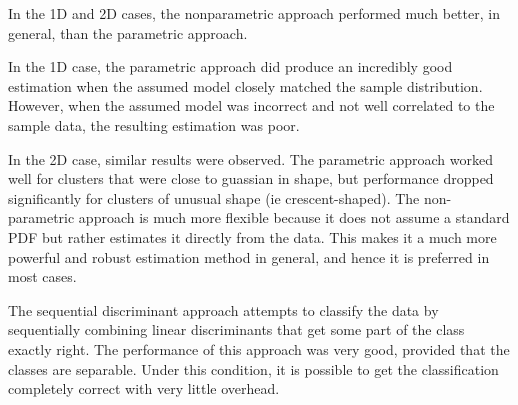 In the 1D and 2D cases, the nonparametric approach performed much better, in
general, than the parametric approach.  

In the 1D case, the parametric approach did produce an incredibly good
estimation when the assumed model closely matched the sample distribution. 
However, when the assumed model was incorrect and not well correlated to the
sample data, the resulting estimation was poor.

In the 2D case, similar results were observed.  The parametric approach worked
well for clusters that were close to guassian in shape, but performance
dropped significantly for clusters of unusual shape (ie crescent-shaped).  The
non-parametric approach is much more flexible because it does not assume a
standard PDF but rather estimates it directly from the data.  This makes it a
much more powerful and robust estimation method in general, and hence it is
preferred in most cases.  

The sequential discriminant approach attempts to classify the data by
sequentially combining linear discriminants that get some part of the class
exactly right.  The performance of this approach was very good, provided that the
classes are separable.  Under this condition, it is possible to get the
classification completely correct with very little overhead.